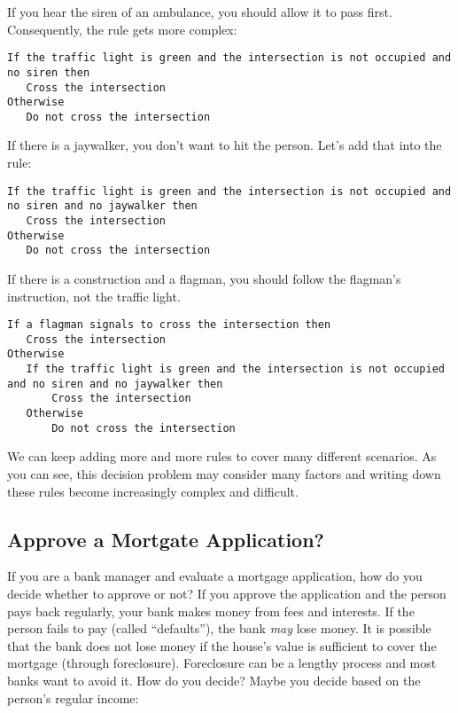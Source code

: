 If you hear the siren of an ambulance, you should allow it to pass first.
Consequently, the rule gets more complex:

\begin{verbatim}
If the traffic light is green and the intersection is not occupied and no siren then
   Cross the intersection
Otherwise
   Do not cross the intersection
\end{verbatim}

If there is a jaywalker, you don't want to hit the person. Let's add that into the rule:

\begin{verbatim}
If the traffic light is green and the intersection is not occupied and no siren and no jaywalker then
   Cross the intersection
Otherwise
   Do not cross the intersection
\end{verbatim}

If there is a construction and a flagman, you should follow the
flagman's instruction, not the traffic light.  

\begin{verbatim}
If a flagman signals to cross the intersection then
   Cross the intersection
Otherwise
   If the traffic light is green and the intersection is not occupied and no siren and no jaywalker then
       Cross the intersection
   Otherwise
       Do not cross the intersection
\end{verbatim}

We can keep adding more and more rules to cover many different
scenarios.  As you can see, this decision problem may consider many
factors and writing down these rules become increasingly complex and
difficult.

\subsection{Approve a Mortgate Application?}

If you are a bank manager and evaluate a mortgage application, how do
you decide whether to approve or not?  If you approve the application
and the person pays back regularly, your bank makes money from fees
and interests.  If the person fails to pay (called ``defaults''), the
bank {\it may} lose money. It is possible that the bank does not lose
money if the house's value is sufficient to cover the mortgage
(through foreclosure). Foreclosure can be a lengthy process and most
banks want to avoid it.  How do you decide? Maybe you decide
based on the person's regular income:



